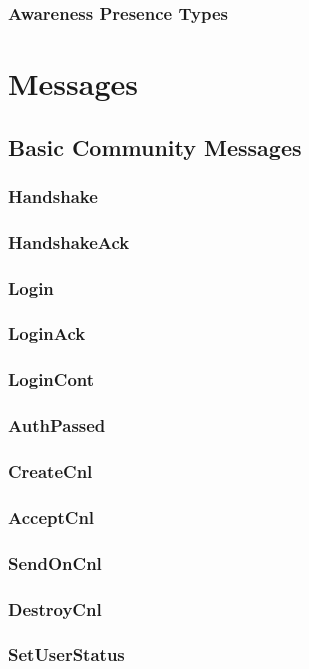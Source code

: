 \documentclass[titlepage,oneside]{book}
\begin{document}
\subsubsection{Awareness Presence Types}

\section{Messages}
\subsection{Basic Community Messages}
\subsubsection{Handshake}
\subsubsection{HandshakeAck}
\subsubsection{Login}
\subsubsection{LoginAck}
\subsubsection{LoginCont}
\subsubsection{AuthPassed}
\subsubsection{CreateCnl}
\subsubsection{AcceptCnl}
\subsubsection{SendOnCnl}
\subsubsection{DestroyCnl}
\subsubsection{SetUserStatus}
\end{document}
